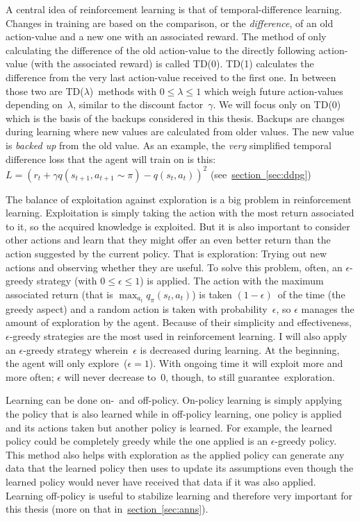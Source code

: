 \documentclass[a4paper,titlepage]{article}
\begin{document}
A central idea of reinforcement learning is that of temporal-difference learning. Changes in training are based on the comparison, or the \emph{difference}, of an old action-value and a new one with an associated reward. The method of only calculating the difference of the old action-value to the directly following action-value (with the associated reward) is called TD(0). TD(1) calculates the difference from the very last action-value received to the first one. In between those two are TD($\lambda$)~methods with $0 \leq \lambda \leq 1$ which weigh future action-values depending on~$\lambda$, similar to the discount factor~$\gamma$. We will focus only on TD(0) which is the basis of the backups considered in this thesis. Backups are changes during learning where new values are calculated from older values. The new value is \emph{backed up} from the old value.
As an example, the  \emph{very} simplified temporal difference loss that the agent will train on is this: $L = (r_t + \gamma q(s_{t+1}, a_{t+1} \sim \pi) - q(s_t, a_t))^2$ (see~\hyperref[sec:ddpg]{section~\ref*{sec:ddpg}})

The balance of exploitation against exploration is a big problem in reinforcement learning. Exploitation is simply taking the action with the most return associated to it, so the acquired knowledge is exploited. But it is also important to consider other actions and learn that they might offer an even better return than the action suggested by the current policy. That is exploration: Trying out new actions and observing whether they are useful. To solve this problem, often, an $\epsilon$-greedy strategy (with $0 \leq \epsilon \leq 1$) is applied. The action with the maximum associated return (that is $\max_{a_t} q_\pi(s_t, a_t)$) is taken $(1 - \epsilon)$~of the time (the greedy aspect) and a random action is taken with probability~$\epsilon$, so $\epsilon$ manages the amount of exploration by the agent. Because of their simplicity and effectiveness, $\epsilon$-greedy strategies are the most used in reinforcement learning. I will also apply an $\epsilon$-greedy strategy wherein~$\epsilon$ is decreased during learning. At the beginning, the agent will only explore~($\epsilon = 1$). With ongoing time it will exploit more and more often; $\epsilon$ will never decrease to~0, though, to still guarantee~exploration.

Learning can be done on-~and off-policy. On-policy learning is simply applying the policy that is also learned while in off-policy learning, one policy is applied and its actions taken but another policy is learned. For example, the learned policy could be completely greedy while the one applied is an $\epsilon$-greedy policy. This method also helps with exploration as the applied policy can generate any data that the learned policy then uses to update its assumptions even though the learned policy would never have received that data if it was also applied. Learning off-policy is useful to stabilize learning and therefore very important for this thesis (more on that in~\hyperref[sec:anns]{section~\ref*{sec:anns}}). \medskip
\end{document}
